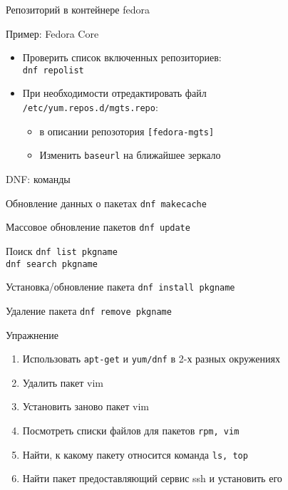 \begin{frame}[fragile]{Репозиторий в контейнере fedora}
	\begin{block}{Пример: Fedora Core}
	\begin{itemize}
	    \item Проверить список включенных репозиториев: \\
	    {\tt dnf repolist}
	    \item При необходимости отредактировать файл \\
		        {\tt /etc/yum.repos.d/mgts.repo}:
		\begin{itemize}
		    \item в описании репозотория {\tt [fedora-mgts]}
		    \item Изменить {\tt baseurl} на ближайшее зеркало
		\end{itemize}
	\end{itemize}
	\end{block}
\end{frame}


\begin{frame}{DNF: команды}
	\begin{block}{Обновление данных о пакетах}
		{\tt dnf makecache}
	\end{block}
	\begin{block}{Массовое обновление пакетов}
		{\tt dnf update }
	\end{block}
	\begin{block}{Поиск}
		{\tt dnf list pkgname }\\
		{\tt dnf search pkgname }
	\end{block}
	\begin{block}{Установка/обновление пакета}
		{\tt dnf install pkgname }
	\end{block}
	\begin{block}{Удаление пакета}
		{\tt dnf remove pkgname }
	\end{block}
\end{frame}


\begin{frame}[fragile]{Упражнение}
  \begin{enumerate}
      \item Использовать {\tt apt-get} и {\tt yum/dnf} в 2-х разных окружениях
      \item Удалить пакет vim
      \item Установить заново пакет vim
      \item Посмотреть списки файлов для пакетов {\tt rpm, vim}
      \item Найти, к какому пакету относится команда {\tt ls, top}
      \item Найти пакет предоставляющий сервис ssh и установить его
    \end{enumerate}
\end{frame}
